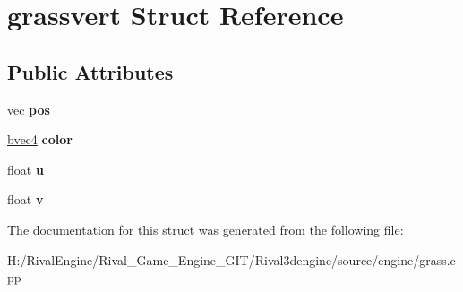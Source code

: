 \hypertarget{structgrassvert}{}\section{grassvert Struct Reference}
\label{structgrassvert}
\subsection*{Public Attributes}
\begin{DoxyCompactItemize}
\item 
\mbox{\label{structgrassvert_a17aa75c6105d5ccfdbb795bb24f43075}} 
\hyperlink{structvec}{vec} {\bfseries pos}
\item 
\mbox{\label{structgrassvert_ad16d70c6d060718dae6aeabfde03aa34}} 
\hyperlink{structbvec4}{bvec4} {\bfseries color}
\item 
\mbox{\label{structgrassvert_abad5a052083196ca8db8ce534e69589f}} 
float {\bfseries u}
\item 
\mbox{\label{structgrassvert_a4bf966fe084bbe255000bb71efd220ec}} 
float {\bfseries v}
\end{DoxyCompactItemize}


The documentation for this struct was generated from the following file\+:\begin{DoxyCompactItemize}
\item 
H\+:/\+Rival\+Engine/\+Rival\+\_\+\+Game\+\_\+\+Engine\+\_\+\+G\+I\+T/\+Rival3dengine/source/engine/grass.\+cpp\end{DoxyCompactItemize}
